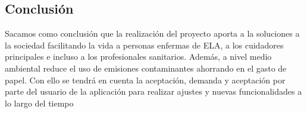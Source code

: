 \subsection{Conclusión}
Sacamos como conclusión que la realización del proyecto aporta a la soluciones a la sociedad facilitando la vida a personas enfermas de ELA, a los cuidadores principales e incluso a los profesionales sanitarios. Además, a nivel medio ambiental reduce el uso de emisiones contaminantes ahorrando en el gasto de papel. 
Con ello se tendrá en cuenta la aceptación, demanda y aceptación por parte del usuario de la aplicación para realizar ajustes y nuevas funcionalidades a lo largo del tiempo
